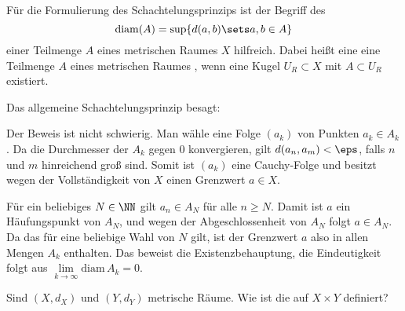 \begin{antwort}
  Für die Formulierung des Schachtelungsprinzips ist der Begriff des 
  \[
  \mathrm{diam}(A) = \sup\{ d(a,b) \sets a,b \in A \}
  \]
  einer  Teilmenge $A$ eines 
  metrischen Raumes $X$ hilfreich. Dabei heißt eine eine Teilmenge 
  $A$ eines metrischen Raumes , wenn eine Kugel 
  $U_R \subset X$ mit $A\subset U_R$ existiert.


  Das allgemeine Schachtelungsprinzip besagt: 

  \medskip\noindent

  \medskip\noindent
  Der Beweis ist nicht schwierig. 
  Man wähle eine Folge $(a_k)$ von Punkten $a_k \in A_k$. 
  Da die Durchmesser der $A_k$ gegen $0$ konvergieren, gilt 
  $d(a_n,a_m)< \eps$, falls $n$ und $m$ hinreichend groß sind. Somit ist 
  $(a_k)$ eine Cauchy-Folge und besitzt wegen der Vollständigkeit von 
  $X$ einen Grenzwert $a\in X$. 

  Für ein beliebiges $N\in \NN$ gilt $a_n \in A_N$ für alle 
  $n \ge N$. Damit ist $a$ ein Häufungspunkt von $A_N$, und wegen 
  der Abgeschlossenheit von $A_N$ folgt $a \in A_N$. Da das für eine 
  beliebige Wahl von $N$ gilt, ist der Grenzwert $a$ 
  also in allen Mengen $A_k$ enthalten. 
  Das beweist die Existenzbehauptung, die Eindeutigkeit folgt aus 
  $\lim\limits_{k\to\infty} \mathrm{diam}\, A_k=0$.   \AntEnd
\end{antwort}

\begin{frage}\label{09_produktmetrik}
  Sind $(X,d_X)$ und $(Y,d_Y)$ metrische Räume. Wie ist die 
   auf $X\times Y$ definiert?
\end{frage}

